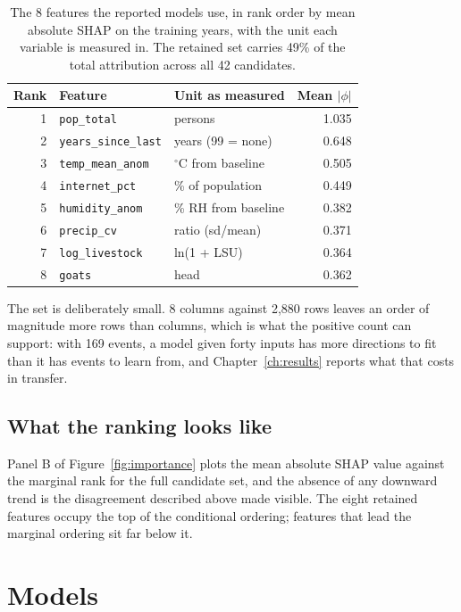 \documentclass[10pt,openany]{report}
\begin{document}
\begin{table}[htbp]
\centering
\caption{The 8 features the reported models use, in rank order by mean absolute SHAP on the
training years, with the unit each variable is measured in. The retained set carries 49\% of the
total attribution across all 42 candidates.}
\label{tab:selected}
\small
\begin{tabular}{@{}rlp{4.6cm}r@{}}
\toprule
\textbf{Rank} & \textbf{Feature} & \textbf{Unit as measured} & \textbf{Mean $|\phi|$} \\
\midrule
1 & \texttt{pop\_total} & persons & 1.035 \\
2 & \texttt{years\_since\_last} & years (99 = none) & 0.648 \\
3 & \texttt{temp\_mean\_anom} & $^\circ$C from baseline & 0.505 \\
4 & \texttt{internet\_pct} & \% of population & 0.449 \\
5 & \texttt{humidity\_anom} & \% RH from baseline & 0.382 \\
6 & \texttt{precip\_cv} & ratio (sd/mean) & 0.371 \\
7 & \texttt{log\_livestock} & ln(1 + LSU) & 0.364 \\
8 & \texttt{goats} & head & 0.362 \\
\bottomrule
\end{tabular}
\end{table}

The set is deliberately small. 8 columns against 2,880 rows leaves an order of magnitude more
rows than columns, which is what the positive count can support: with 169 events, a model
given forty inputs has more directions to fit than it has events to learn from, and
Chapter~\ref{ch:results} reports what that costs in transfer.

\subsection{What the ranking looks like}

Panel B of Figure~\ref{fig:importance} plots the mean absolute SHAP value against the marginal rank
for the full candidate set, and the absence of any downward trend is the disagreement described
above made visible. The eight retained features occupy the top of the conditional ordering; features
that lead the marginal ordering sit far below it.

\section{Models}
\end{document}
